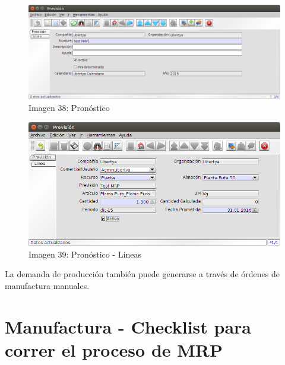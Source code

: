 \documentclass[letterpaper,10pt,spanish]{sphinxmanual}
\begin{document}
\begin{figure}[htbp]
\centering
\capstart

\includegraphics{ly_pronost_1.png}
\caption{Imagen 38: Pronóstico}\end{figure}
\begin{figure}[htbp]
\centering
\capstart

\includegraphics{ly_pronost_2.png}
\caption{Imagen 39: Pronóstico - Líneas}\end{figure}

La demanda de producción también puede generarse a través de órdenes de manufactura manuales.


\section{Manufactura - Checklist para correr el proceso de MRP}
\label{manufactura-checklist::doc}\label{manufactura-checklist:manufactura-checklist-para-correr-el-proceso-de-mrp}
\end{document}
